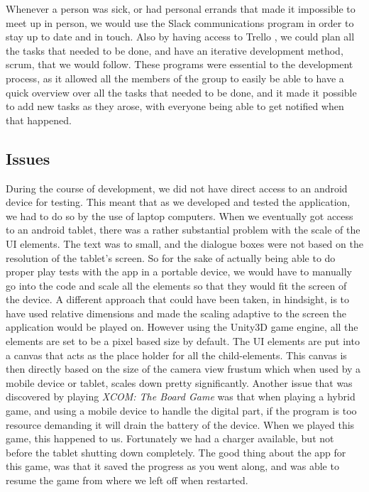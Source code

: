 Whenever a person was sick, or had personal errands that made it impossible to meet up in person, we would use the Slack \cite{prog:slack} communications program in order to stay up to date and in touch. Also by having access to Trello \cite{prog:trello}, we could plan all the tasks that needed to be done, and have an iterative development method, scrum, that we would follow. These programs were essential to the development process, as it allowed all the members of the group to easily be able to have a quick overview over all the tasks that needed to be done, and it made it possible to add new tasks as they arose, with everyone being able to get notified when that happened.

\subsection{Issues}
During the course of development, we did not have direct access to an android device for testing. This meant that as we developed and tested the application, we had to do so by the use of laptop computers. When we eventually got access to an android tablet, there was a rather substantial problem with the scale of the UI elements. The text was to small, and the dialogue boxes were not based on the resolution of the tablet's screen. So for the sake of actually being able to do proper play tests with the app in a portable device, we would have to manually go into the code and scale all the elements so that they would fit the screen of the device. A different approach that could have been taken, in hindsight, is to have used relative dimensions and made the scaling adaptive to the screen the application would be played on. However using the Unity3D game engine, all the elements are set to be a pixel based size by default. The UI elements are put into a canvas that acts as the place holder for all the child-elements. This canvas is then directly based on the size of the camera view frustum which when used by a mobile device or tablet, scales down pretty significantly. 
Another issue that was discovered by playing \textit{XCOM: The Board Game} \cite{game:xcomtbg} was that when playing a hybrid game, and using a mobile device to handle the digital part, if the program is too resource demanding it will drain the battery of the device. When we played this game, this happened to us. Fortunately we had a charger available, but not before the tablet shutting down completely. The good thing about the app for this game, was that it saved the progress as you went along, and was able to resume the game from where we left off when restarted.




